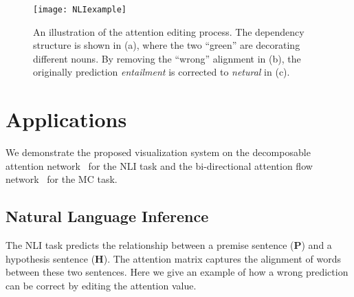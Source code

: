 \begin{figure*}[t]
\centering
\vspace{-2mm}
 \texttt{[image: NLIexample]}
  \vspace{-6mm}
 \caption{
An illustration of the attention editing process.
The dependency structure is shown in (a), where the two ``green'' are decorating different nouns.
By removing the ``wrong'' alignment in (b), the originally prediction \emph{entailment} is corrected to \emph{netural} in (c).
}
  \vspace{-3mm}
\label{fig:NLIexample}
\end{figure*}

\section{Applications}
We demonstrate the proposed visualization system on the decomposable attention network~\cite{parikh2016emnlp}
for the NLI task and the bi-directional attention flow network~\cite{Seo2016} for the MC task.

\subsection{Natural Language Inference}
\label{sec:NLIexample}
The NLI task predicts the relationship between a premise sentence (\textbf{P}) and a hypothesis sentence (\textbf{H}).
The attention matrix captures the alignment of words between these two sentences.
Here we give an example of how a wrong prediction can be correct by editing the attention value.  


